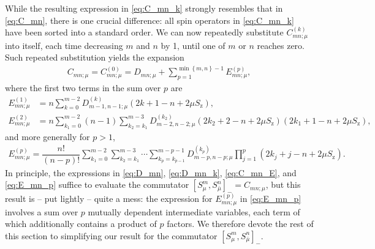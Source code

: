 \documentclass[pra,reprint,longbibliography]{revtex4-1}
\newcommand{\f}[2]{\dfrac{#1}{#2}} %
\newcommand{\p}[1]{\left(#1\right)} %
\renewcommand{\sp}[1]{\left[#1\right]} %
\renewcommand{\set}[1]{\left\{#1\right\}} %
\newcommand{\z}{\text{z}}
\newcommand{\bmu}{{\bar\mu}}
\newcommand{\1}{\mathds{1}}
\begin{document}
While the resulting expression in \eqref{eq:C_mn_k} strongly resembles
that in \eqref{eq:C_mn}, there is one crucial difference: all spin
operators in \eqref{eq:C_mn_k} have been sorted into a standard order.
We can now repeatedly substitute $C_{mn;\mu}^{(k)}$ into itself, each
time decreasing $m$ and $n$ by 1, until one of $m$ or $n$ reaches
zero.  Such repeated substitution yields the expansion
\begin{align}
  C_{mn;\mu}
  = C_{mn;\mu}^{(0)}
  = D_{mn;\mu}
  + \sum_{p=1}^{\min\set{m,n}-1} E_{mn;\mu}^{(p)},
  \label{eq:C_mn_E}
\end{align}
where the first two terms in the sum over $p$ are
\begin{align}
  E_{mn;\mu}^{(1)}
  &= n \sum_{k=0}^{m-2} D_{m-1,n-1;\mu}^{(k)} \p{2k+1-n+2\mu S_\z}, \\
  E_{mn;\mu}^{(2)}
  &= n \sum_{k_1=0}^{m-2} \p{n-1} \sum_{k_2=k_1}^{m-3}
  D_{m-2,n-2;\mu}^{(k_2)} \p{2k_2+2-n+2\mu S_\z} \p{2k_1+1-n+2\mu S_\z},
\end{align}
and more generally for $p>1$,
\begin{align}
  E_{mn;\mu}^{(p)}
  = \f{n!}{\p{n-p}!}
  \sum_{k_1=0}^{m-2} \sum_{k_2=k_1}^{m-3} \cdots\sum_{k_p=k_{p-1}}^{m-p-1}
  D_{m-p,n-p;\mu}^{(k_p)} \prod_{j=1}^p \p{2k_j+j-n+2\mu S_\z}.
  \label{eq:E_mn_p}
\end{align}
In principle, the expressions in \eqref{eq:D_mn}, \eqref{eq:D_mn_k},
\eqref{eq:C_mn_E}, and \eqref{eq:E_mn_p} suffice to evaluate the
commutator $\sp{S_\mu^m,S_\bmu^n}_- = C_{mn;\mu}$, but this result is
-- put lightly -- quite a mess: the expression for $E_{mn;\mu}^{(p)}$
in \eqref{eq:E_mn_p} involves a sum over $p$ mutually dependent
intermediate variables, each term of which additionally contains a
product of $p$ factors.  We therefore devote the rest of this section
to simplifying our result for the commutator
$\sp{S_\mu^m,S_\bmu^n}_-$.
\end{document}
